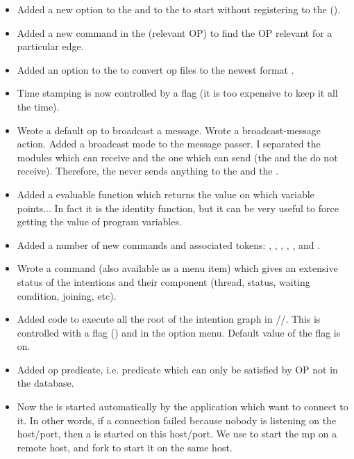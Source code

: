 \begin{itemize}

\item Added a new option to the \CPK{} and to the \XPK{} to start
without registering to the \OPRSS{} ().

\item Added a new command in the \OPE{} (relevant OP) to find the
OP relevant for a particular edge.

\item Added an option to the \OPE{} to convert op files to the
newest format .

\item Time stamping is now controlled by a flag (it is too
expensive to keep it all the time).

\item Wrote a default op to broadcast a message. Wrote a broadcast-message action.
Added a broadcast mode to the message passer. I separated the modules which can
receive and the one which can send (the \OPE{} and the \OPRSS{} do not
receive). Therefore, the \MP{} never sends anything to the \OPRSS{} and the
\OPE{}.

\item Added a  evaluable function which returns the value on which
variable points... In fact it is the identity function, but it can be very
useful to force getting the value of program variables.

\item Added a number of new commands and associated tokens:
, , , , ,  and .

\item Wrote a  command (also available as a menu item)
which gives an extensive status of the intentions and their component (thread,
status, waiting condition, joining, etc).

\item Added code to execute all the root of the intention graph in //. This
is controlled with a flag () and in the
option menu. Default value of the flag is on.

\item Added op predicate, i.e. predicate which can only be satisfied by
OP not in the database.

\item Now the \MP{} is started automatically by the application which want to
connect to it. In other words, if a connection failed because nobody is
listening on the host/port, then a \MP{} is started on this host/port.  We use
 to start the mp on a remote host, and fork to start it on the same host.


\end{itemize}
